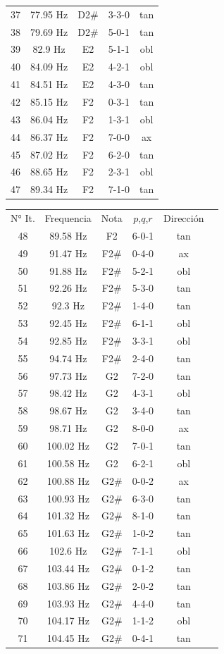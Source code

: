 \begin{table}[]
\begin{tabular}{c|c|c|c|c}
37&77.95 Hz&D2\#&3-3-0&tan\\
38&79.69 Hz&D2\#&5-0-1&tan\\
39&82.9 Hz&E2&5-1-1&obl\\
40&84.09 Hz&E2&4-2-1&obl\\
41&84.51 Hz&E2&4-3-0&tan\\
42&85.15 Hz&F2&0-3-1&tan\\
43&86.04 Hz&F2&1-3-1&obl\\
44&86.37 Hz&F2&7-0-0&ax\\
45&87.02 Hz&F2&6-2-0&tan\\
46&88.65 Hz&F2&2-3-1&obl\\
47&89.34 Hz&F2&7-1-0&tan\\

    \end{tabular}
    \quad
    \begin{tabular}{c|c|c|c|c|c}
N° It. & Frequencia & Nota & $p$,$q$,$r$ & Dirección \\
48&89.58 Hz&F2&6-0-1&tan\\
49&91.47 Hz&F2\#&0-4-0&ax\\
50&91.88 Hz&F2\#&5-2-1&obl\\
51&92.26 Hz&F2\#&5-3-0&tan\\
52&92.3 Hz&F2\#&1-4-0&tan\\
53&92.45 Hz&F2\#&6-1-1&obl\\
54&92.85 Hz&F2\#&3-3-1&obl\\
55&94.74 Hz&F2\#&2-4-0&tan\\
56&97.73 Hz&G2&7-2-0&tan\\
57&98.42 Hz&G2&4-3-1&obl\\
58&98.67 Hz&G2&3-4-0&tan\\
59&98.71 Hz&G2&8-0-0&ax\\
60&100.02 Hz&G2&7-0-1&tan\\
61&100.58 Hz&G2&6-2-1&obl\\
62&100.88 Hz&G2\#&0-0-2&ax\\
63&100.93 Hz&G2\#&6-3-0&tan\\
64&101.32 Hz&G2\#&8-1-0&tan\\
65&101.63 Hz&G2\#&1-0-2&tan\\
66&102.6 Hz&G2\#&7-1-1&obl\\
67&103.44 Hz&G2\#&0-1-2&tan\\
68&103.86 Hz&G2\#&2-0-2&tan\\
69&103.93 Hz&G2\#&4-4-0&tan\\
70&104.17 Hz&G2\#&1-1-2&obl\\
71&104.45 Hz&G2\#&0-4-1&tan\\

\end{tabular}
\end{table}
